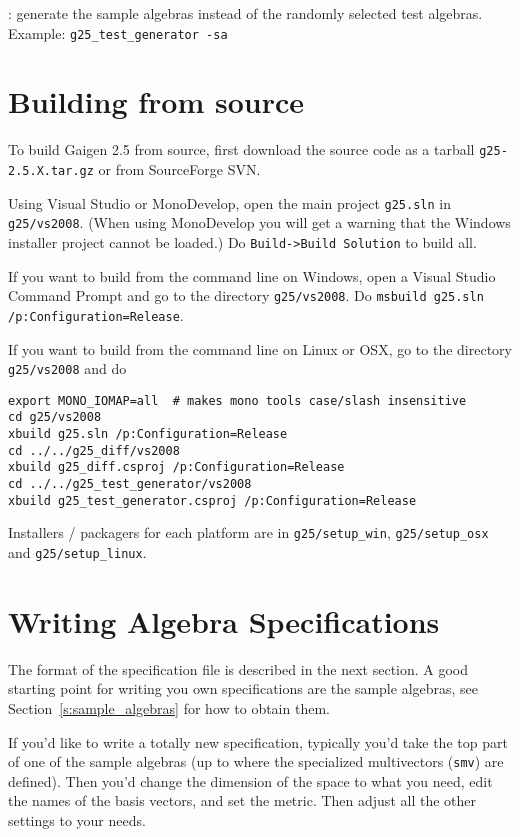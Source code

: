 \documentclass[10pt, a4paper]{article}
\begin{document}
\vspace*{2mm}

: generate the sample algebras instead of the randomly
selected test algebras.
Example: {\tt g25\_test\_generator -sa}

\section{Building from source}

To build Gaigen 2.5 from source, first download the source code as a tarball {\tt g25-2.5.X.tar.gz}
or from SourceForge SVN.

Using Visual Studio or MonoDevelop, open the main project {\tt g25.sln} in {\tt g25/vs2008}.
(When using MonoDevelop you will get a warning that the Windows installer project cannot be loaded.)
Do {\tt Build->Build Solution} to build all. 

If you want to build from the command line on Windows, open a Visual Studio Command Prompt and
go to the directory {\tt g25/vs2008}. Do {\tt msbuild g25.sln /p:Configuration=Release}.

If you want to build from the command line on Linux or OSX, go to the directory {\tt g25/vs2008}
and do 
\begin{verbatim}
export MONO_IOMAP=all  # makes mono tools case/slash insensitive
cd g25/vs2008
xbuild g25.sln /p:Configuration=Release
cd ../../g25_diff/vs2008
xbuild g25_diff.csproj /p:Configuration=Release
cd ../../g25_test_generator/vs2008
xbuild g25_test_generator.csproj /p:Configuration=Release
\end{verbatim}

Installers / packagers for each platform are in {\tt g25/setup\_win}, 
{\tt g25/setup\_osx} and {\tt g25/setup\_linux}.


\section{Writing Algebra Specifications}

The format of the specification file is described in the next section.
A good starting point for writing you own specifications are the sample algebras,
see Section~\ref{s:sample_algebras} for how to obtain them.

If you'd like to write a totally new specification, typically you'd take the top part
of one of the sample algebras (up to where the specialized multivectors ({\tt smv}) are defined).
Then you'd change the dimension of the space to what you need, edit the names of the basis
vectors, and set the metric. Then adjust all the other settings to your needs.
\end{document}

